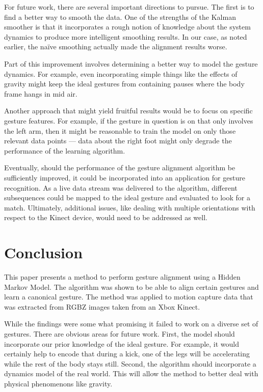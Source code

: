\documentclass{article}
\begin{document}
For future work, there are several important directions to pursue. The first is to
find a better way to smooth the data. One of the strengths of the Kalman
smoother is that it incorporates a rough notion of knowledge about the
system dynamics to produce more intelligent smoothing results. In our case,
as noted earlier, the na\"ive smoothing actually made the alignment results
worse.

Part of this improvement involves determining a better way to model the gesture
dynamics. For example, even incorporating simple things like the effects of gravity
might keep the ideal gestures from containing pauses where the body frame
hangs in mid air.

Another approach that might yield fruitful results would be to focus on specific
gesture features. For example, if the gesture in question is on that only involves the
left arm, then it might be reasonable to train the model on only those relevant
data points --- data about the right foot might only degrade the performance of the
learning algorithm.

Eventually, should the performance of the gesture alignment algorithm be
sufficiently improved, it could be incorporated into an application for gesture
recognition. As a live data stream was delivered to the algorithm, different
subsequences could be mapped to the ideal gesture and evaluated to look
for a match. Ultimately, additional issues, like dealing with multiple orientations with
respect to the Kinect device, would need to be addressed as well.

\section{Conclusion}




This paper presents a method to perform gesture alignment using a Hidden
Markov Model. The algorithm was shown to be able to align certain gestures and
learn a canonical gesture. The method was applied to motion capture data that
was extracted from RGBZ images taken from an Xbox Kinect.

While the findings were some what promising it failed to work on a diverse set
of gestures. There are obvious areas for future work. First, the model should
incorporate our prior knowledge of the ideal gesture. For example, it would
certainly help to encode that during a kick, one of the legs will be
accelerating while the rest of the body stays still. Second, the algorithm
should incorporate a dynamics model of the real world. This will allow the
method to better deal with physical phenomenons like gravity.







\end{document}
